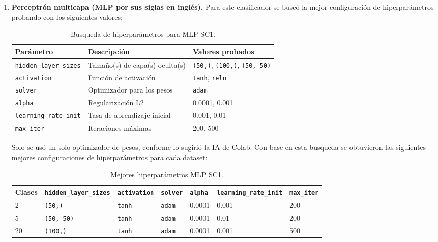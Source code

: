 \documentclass[12pt,a4paper]{article}
\begin{document}
\begin{enumerate}
   \item \textbf{Perceptrón multicapa (MLP por sus siglas en inglés).}
   Para este clasificador se buscó la mejor configuración de hiperparámetros probando con los siguientes valores:

   \begin{table}[htbp]
    \centering\small
    \setlength{\tabcolsep}{4pt}
    \begin{tabularx}{\linewidth}{@{}l l X@{}}
      \toprule
      \textbf{Parámetro} & \textbf{Descripción} & \textbf{Valores probados} \\
      \midrule
      \texttt{hidden\_layer\_sizes} & Tamaño(s) de capa(s) oculta(s) & \texttt{(50,)}, \texttt{(100,)}, \texttt{(50, 50)} \\
      \texttt{activation}           & Función de activación          & \texttt{tanh}, \texttt{relu} \\
      \texttt{solver}               & Optimizador para los pesos     & \texttt{adam} \\
      \texttt{alpha}                & Regularización L2              & 0.0001, 0.001 \\
      \texttt{learning\_rate\_init} & Tasa de aprendizaje inicial    & 0.001, 0.01 \\
      \texttt{max\_iter}            & Iteraciones máximas            & 200, 500 \\
      \bottomrule
    \end{tabularx}
    \caption{Busqueda de hiperparámetros para MLP SC1.}
    \label{tab:param_mlp_sc1}
  \end{table}

   Solo se usó un solo optimizador de pesos, conforme lo sugirió la IA de Colab. Con base en esta busqueda se obtuvieron 
   las siguientes mejores configuraciones de hiperparámetros para cada dataset:

  \begin{table}[htbp]
    \centering\small
    \setlength{\tabcolsep}{4pt}
    \begin{tabularx}{\linewidth}{@{}l l l l l l l@{}}
      \toprule
      \textbf{Clases} & \textbf{\texttt{hidden\_layer\_sizes}} & \textbf{\texttt{activation}} & \textbf{\texttt{solver}} & \textbf{\texttt{alpha}} & \textbf{\texttt{learning\_rate\_init}} & \textbf{\texttt{max\_iter}} \\
      \midrule
      2  & \texttt{(50,)}     & \texttt{tanh} & \texttt{adam} & 0.0001 & 0.001 & 200 \\
      5  & \texttt{(50, 50)}  & \texttt{tanh} & \texttt{adam} & 0.0001 & 0.01  & 200 \\
      20 & \texttt{(100,)}    & \texttt{tanh} & \texttt{adam} & 0.0001 & 0.001 & 500 \\
      \bottomrule
    \end{tabularx}
    \caption{Mejores hiperparámetros MLP SC1.}
    \label{tab:best_hparams_mlp_SC1}
  \end{table}


\end{enumerate}
\end{document}
